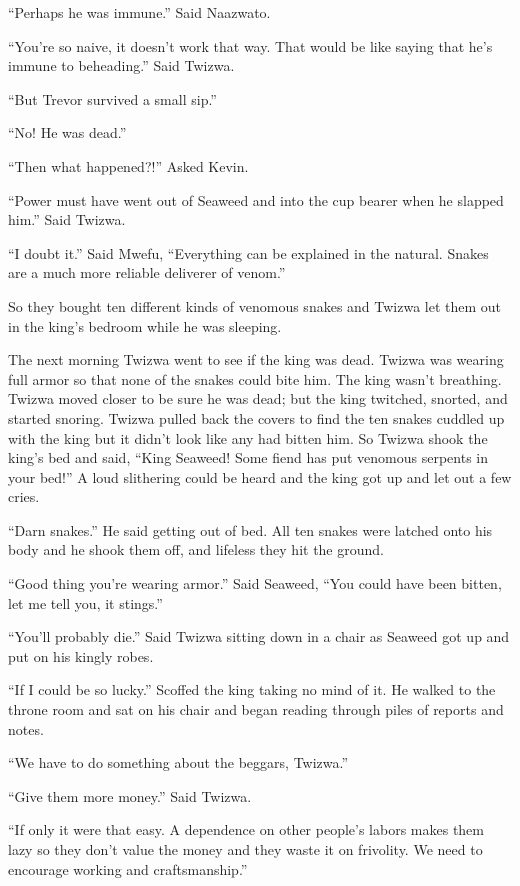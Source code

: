 ``Perhaps he was immune.'' Said Naazwato.

``You're so naive, it doesn't work that way. That would be like saying that he's immune to beheading.'' Said Twizwa.

``But Trevor survived a small sip.''

``No! He was dead.''

``Then what happened?!'' Asked Kevin.

``Power must have went out of Seaweed and into the cup bearer when he slapped him.'' Said Twizwa.

``I doubt it.'' Said Mwefu, ``Everything can be explained in the natural. Snakes are a much more reliable deliverer of venom.''

So they bought ten different kinds of venomous snakes and Twizwa let them out in the king's bedroom while he was sleeping.

The next morning Twizwa went to see if the king was dead. Twizwa was wearing full armor so that none of the snakes could bite him. The king wasn't breathing. Twizwa moved closer to be sure he was dead; but the king twitched, snorted, and started snoring. Twizwa pulled back the covers to find the ten snakes cuddled up with the king but it didn't look like any had bitten him. So Twizwa shook the king's bed and said, ``King Seaweed! Some fiend has put venomous serpents in your bed!'' A loud slithering could be heard and the king got up and let out a few cries.

``Darn snakes.'' He said getting out of bed. All ten snakes were latched onto his body and he shook them off, and lifeless they hit the ground.

``Good thing you're wearing armor.'' Said Seaweed, ``You could have been bitten, let me tell you, it stings.''

``You'll probably die.'' Said Twizwa sitting down in a chair as Seaweed got up and put on his kingly robes.

``If I could be so lucky.'' Scoffed the king taking no mind of it. He walked to the throne room and sat on his chair and began reading through piles of reports and notes.

``We have to do something about the beggars, Twizwa.''

``Give them more money.'' Said Twizwa.

``If only it were that easy. A dependence on other people's labors makes them lazy so they don't value the money and they waste it on frivolity. We need to encourage working and craftsmanship.''

